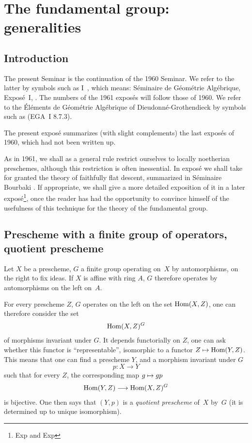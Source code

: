 \chapter{The fundamental group: generalities}
\label{V}

\setcounter{section}{-1}
\section{Introduction}

The present Seminar is the continuation of the 1960 Seminar. We
refer to the latter by symbols such as I~,
which means: S\'eminaire de G\'eom\'etrie Alg\'ebrique,
Expos\'e~I, . The numbers of the 1961 expos\'es will follow
those of 1960. We refer to the \'El\'ements de
G\'eom\'etrie Alg\'ebrique of Dieudonn\'e-Grothendieck by
symbols such as (EGA~I 8.7.3).

The present expos\'e summarizes (with slight
complements) the last expos\'es of 1960, which had not
been written up.

As in 1961, we shall as a general rule restrict ourselves
to locally noetherian preschemes, although this restriction is
often inessential. In
expos\'e  we shall take for granted the theory of faithfully flat descent,
summarized in S\'eminaire Bourbaki . If appropriate,
we shall give a more detailed exposition of it in a
later expos\'e\footnote{\Cf Exp\ptbl {} and Exp\ptbl {}}, once
the reader has had the opportunity to convince himself of the usefulness of
this technique for the theory of the fundamental group.

\section{Prescheme with a finite group of operators,
quotient prescheme}
\label{V.1}

Let $X$ be a prescheme, $G$ a finite group operating on~$X$ by automorphisms, on the right to fix ideas. If $X$
is affine with ring $A$, $G$ therefore operates by automorphisms on
the left on~$A$.

For every prescheme $Z$, $G$ operates on the left on
the set $\operatorname{Hom}(X,Z)$,
one can therefore consider the set
$$
\operatorname{Hom}(X,Z)^G
$$
of morphisms invariant under $G$. It depends functorially on
$Z$,
one can ask whether this functor is ``representable'',
\ie isomorphic to a functor $Z\mto\Hom(Y,Z)$.
This means that one can find a prescheme $Y$, and a
morphism invariant under $G$
$$
p\colon X\to Y
$$
such that for every $Z$, the corresponding map $g\mto gp$
$$
\Hom(Y,Z)\to \Hom(X,Z)^G
$$
is bijective. One then says that $(Y,p)$ is a
\emph{quotient prescheme}
of~$X$
by~$G$
(it is determined up to unique isomorphism).

